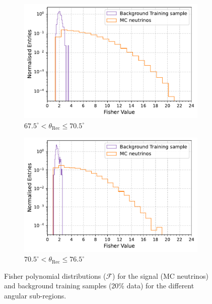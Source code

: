 \begin{figure}[h!]
    \begin{subfigure}[r]{.48\textwidth}
      \centering
      \includegraphics[width=\linewidth]{thesis_figures/Nu_analysis/Fisher_plots/Fisher_nu_bkg_region_67.5_70.5.pdf}
      \caption{$ 67.5^{\circ} <\theta_{\text{Rec}} \leq 70.5^{\circ}$}
    \end{subfigure}
    \hfill    
    \begin{subfigure}[r]{.48\textwidth}
      \centering
      \includegraphics[width=\linewidth]{thesis_figures/Nu_analysis/Fisher_plots/Fisher_nu_bkg_region_70.5_73.5.pdf}
      \caption{$ 70.5^{\circ} <\theta_{\text{Rec}} \leq 76.5^{\circ}$}
   \end{subfigure}
   \caption{Fisher polynomial distributions ($\mathcal{F}$) for the signal (MC neutrinos) and background training samples (20\% data) for the different angular sub-regions.}
    \label{fig:Fisher_dists}

\end{figure}
\FloatBarrier
\clearpage
